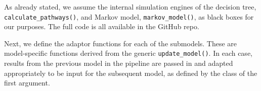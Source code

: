 \documentclass[
]{article}
\newenvironment{Shaded}{\begin{snugshade}}{\end{snugshade}}
\newcommand{\CommentTok}[1]{\textcolor[rgb]{0.37,0.37,0.37}{#1}}
\newcommand{\ControlFlowTok}[1]{\textcolor[rgb]{0.00,0.23,0.31}{\textbf{#1}}}
\newcommand{\DecValTok}[1]{\textcolor[rgb]{0.68,0.00,0.00}{#1}}
\newcommand{\FunctionTok}[1]{\textcolor[rgb]{0.28,0.35,0.67}{#1}}
\newcommand{\NormalTok}[1]{\textcolor[rgb]{0.00,0.23,0.31}{#1}}
\newcommand{\OtherTok}[1]{\textcolor[rgb]{0.00,0.23,0.31}{#1}}
\newcommand{\SpecialCharTok}[1]{\textcolor[rgb]{0.37,0.37,0.37}{#1}}
\begin{document}
As already stated, we assume the internal simulation engines of the
decision tree, \texttt{calculate\_pathways()}, and Markov model,
\texttt{markov\_model()}, as black boxes for our purposes. The full code
is all available in the GitHub repo.

Next, we define the adaptor functions for each of the submodels. These
are model-specific functions derived from the generic
\texttt{update\_model()}. In each case, results from the previous model
in the pipeline are passed in and adapted appropriately to be input for
the subsequent model, as defined by the class of the first argument.

\begin{Shaded}
\end{Shaded}
\end{document}
